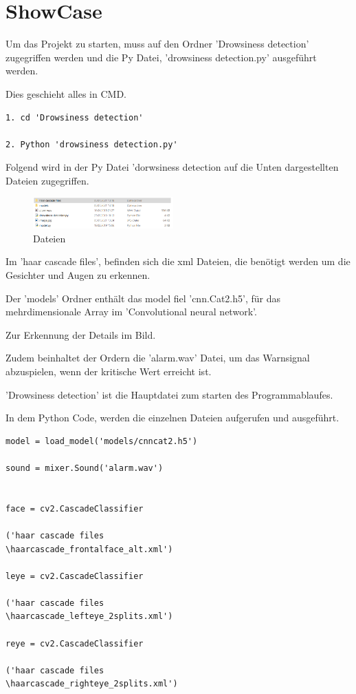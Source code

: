 \section{ShowCase}


Um das  Projekt zu starten, muss auf den Ordner 'Drowsiness detection' zugegriffen werden und die Py Datei, 'drowsiness detection.py' ausgeführt werden.

Dies geschieht alles in CMD.

\begin{lstlisting}
1. cd 'Drowsiness detection'

2. Python 'drowsiness detection.py'

\end{lstlisting}


Folgend wird in der Py Datei 'dorwsiness detection auf die Unten dargestellten Dateien zugegriffen.


\begin{figure}[htbp]
  \centering
     \includegraphics[width=0.48\textwidth]{Dateien.png}
     \caption{Dateien}
\end{figure}

Im 'haar cascade files', befinden sich die xml Dateien, 
die benötigt werden um die Gesichter und Augen zu erkennen.


Der 'models' Ordner enthält das model fiel 'cnn.Cat2.h5', 
für das mehrdimensionale Array im 'Convolutional neural network'. 

Zur Erkennung der Details im Bild.


Zudem beinhaltet der Ordern die 'alarm.wav' Datei,
um das Warnsignal abzuspielen, wenn der kritische Wert erreicht ist.


'Drowsiness detection' ist die Hauptdatei zum starten des Programmablaufes.


In dem Python Code, werden die einzelnen Dateien aufgerufen und ausgeführt.
\newpage
\begin{lstlisting}
model = load_model('models/cnncat2.h5')

sound = mixer.Sound('alarm.wav')


face = cv2.CascadeClassifier

('haar cascade files
\haarcascade_frontalface_alt.xml')

leye = cv2.CascadeClassifier

('haar cascade files
\haarcascade_lefteye_2splits.xml')

reye = cv2.CascadeClassifier

('haar cascade files
\haarcascade_righteye_2splits.xml')

\end{lstlisting} 

